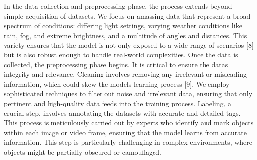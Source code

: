 In the data collection and preprocessing phase, the process extends
beyond simple acquisition of datasets. We focus on amassing data that
represent a broad spectrum of conditions: differing light settings,
varying weather conditions like rain, fog, and extreme brightness, and a
multitude of angles and distances. This variety ensures that the model
is not only exposed to a wide range of scenarios {[}8{]} but is also
robust enough to handle real-world complexities. Once the data is
collected, the preprocessing phase begins. It is critical to ensure the
data\textquotesingle s integrity and relevance. Cleaning involves
removing any irrelevant or misleading information, which could skew the
model\textquotesingle s learning process {[}9{]}. We employ
sophisticated techniques to filter out noise and irrelevant data,
ensuring that only pertinent and high-quality data feeds into the
training process. Labeling, a crucial step, involves annotating the
datasets with accurate and detailed tags. This process is meticulously
carried out by experts who identify and mark objects within each image
or video frame, ensuring that the model learns from accurate
information. This step is particularly challenging in complex
environments, where objects might be partially obscured or camouflaged.

